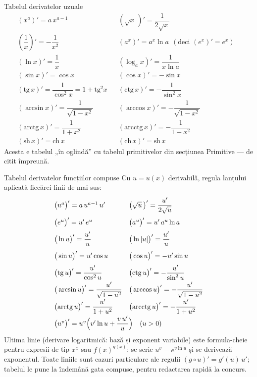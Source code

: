 \begin{tehbox}{Tabelul derivatelor uzuale}
\[
\renewcommand{\arraystretch}{1.7}
\begin{array}{ll|ll}
(x^{a})'=a\,x^{a-1} && (\sqrt{x}\,)'=\dfrac{1}{2\sqrt{x}} &\\[2pt]
\left(\dfrac1x\right)'=-\dfrac{1}{x^{2}} && (a^{x})'=a^{x}\ln a\ \ (\text{deci }(e^{x})'=e^{x}) &\\[2pt]
(\ln x)'=\dfrac1x && (\log_a x)'=\dfrac{1}{x\ln a} &\\[2pt]
(\sin x)'=\cos x && (\cos x)'=-\sin x &\\[2pt]
(\mathrm{tg}\,x)'=\dfrac{1}{\cos^{2}x}=1+\mathrm{tg}^{2}x && (\mathrm{ctg}\,x)'=-\dfrac{1}{\sin^{2}x} &\\[2pt]
(\arcsin x)'=\dfrac{1}{\sqrt{1-x^{2}}} && (\arccos x)'=-\dfrac{1}{\sqrt{1-x^{2}}} &\\[2pt]
(\mathrm{arctg}\,x)'=\dfrac{1}{1+x^{2}} && (\mathrm{arcctg}\,x)'=-\dfrac{1}{1+x^{2}} &\\[2pt]
(\mathrm{sh}\,x)'=\mathrm{ch}\,x && (\mathrm{ch}\,x)'=\mathrm{sh}\,x &
\end{array}
\]
Acesta e tabelul „în oglindă'' cu tabelul primitivelor din secțiunea Primitive --- de citit împreună.
\end{tehbox}

\begin{tehbox}{Tabelul derivatelor funcțiilor compuse}
Cu $u=u(x)$ derivabilă, regula lanțului aplicată fiecărei linii de mai sus:
\[
\renewcommand{\arraystretch}{1.85}
\begin{array}{ll}
\big(u^{a}\big)'=a\,u^{a-1}\,u' & \big(\sqrt{u}\,\big)'=\dfrac{u'}{2\sqrt{u}} \\[2pt]
\big(e^{u}\big)'=u'\,e^{u} & \big(a^{u}\big)'=u'\,a^{u}\ln a \\[2pt]
\big(\ln u\big)'=\dfrac{u'}{u} & \big(\ln|u|\big)'=\dfrac{u'}{u} \\[2pt]
\big(\sin u\big)'=u'\cos u & \big(\cos u\big)'=-u'\sin u \\[2pt]
\big(\mathrm{tg}\,u\big)'=\dfrac{u'}{\cos^{2}u} & \big(\mathrm{ctg}\,u\big)'=-\dfrac{u'}{\sin^{2}u} \\[2pt]
\big(\arcsin u\big)'=\dfrac{u'}{\sqrt{1-u^{2}}} & \big(\arccos u\big)'=-\dfrac{u'}{\sqrt{1-u^{2}}} \\[2pt]
\big(\mathrm{arctg}\,u\big)'=\dfrac{u'}{1+u^{2}} & \big(\mathrm{arcctg}\,u\big)'=-\dfrac{u'}{1+u^{2}} \\[2pt]
\multicolumn{2}{l}{\big(u^{v}\big)'=u^{v}\Big(v'\ln u+\dfrac{v\,u'}{u}\Big)\quad(u>0)}
\end{array}
\]
Ultima linie (derivare logaritmică: bază și exponent variabile) este formula-cheie pentru expresii de tip $x^x$ sau $f(x)^{g(x)}$: se scrie $u^{v}=e^{v\ln u}$ și se derivează exponentul. Toate liniile sunt cazuri particulare ale regulii $(g\circ u)'=g'(u)\,u'$; tabelul le pune la îndemână gata compuse, pentru redactarea rapidă la concurs.
\end{tehbox}


